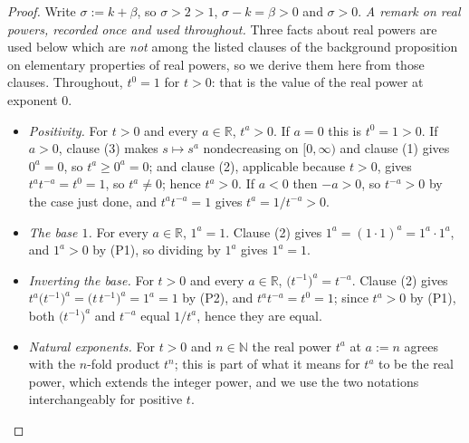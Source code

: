 \begin{proof}
Write $\sigma:=k+\beta$, so $\sigma>2>1$, $\sigma-k=\beta>0$ and $\sigma>0$.
\medskip\noindent\emph{A remark on real powers, recorded once and used throughout.}  Three
facts about real powers are used below which are \emph{not} among the listed clauses of the
background proposition on elementary properties of real powers, so we derive them here from
those clauses.  Throughout, $t^{0}=1$ for $t>0$: that is the value of the real power at
exponent $0$.
\begin{itemize}
\item[(P1)] \emph{Positivity.}  For $t>0$ and every $a\in\mathbb{R}$, $t^{a}>0$.  If $a=0$ this
is $t^{0}=1>0$.  If $a>0$, clause (3) makes $s\mapsto s^{a}$ nondecreasing on $[0,\infty)$ and
clause (1) gives $0^{a}=0$, so $t^{a}\ge0^{a}=0$; and clause (2), applicable because $t>0$,
gives $t^{a}t^{-a}=t^{0}=1$, so $t^{a}\ne0$; hence $t^{a}>0$.  If $a<0$ then $-a>0$, so
$t^{-a}>0$ by the case just done, and $t^{a}t^{-a}=1$ gives $t^{a}=1/t^{-a}>0$.
\item[(P2)] \emph{The base $1$.}  For every $a\in\mathbb{R}$, $1^{a}=1$.  Clause (2) gives
$1^{a}=(1\cdot1)^{a}=1^{a}\cdot1^{a}$, and $1^{a}>0$ by (P1), so dividing by $1^{a}$ gives
$1^{a}=1$.
\item[(P3)] \emph{Inverting the base.}  For $t>0$ and every $a\in\mathbb{R}$,
$\bigl(t^{-1}\bigr)^{a}=t^{-a}$.  Clause (2) gives
$t^{a}\bigl(t^{-1}\bigr)^{a}=\bigl(t\,t^{-1}\bigr)^{a}=1^{a}=1$ by (P2), and
$t^{a}t^{-a}=t^{0}=1$; since $t^{a}>0$ by (P1), both $\bigl(t^{-1}\bigr)^{a}$ and $t^{-a}$
equal $1/t^{a}$, hence they are equal.
\item[(P4)] \emph{Natural exponents.}  For $t>0$ and $n\in\mathbb{N}$ the real power $t^{a}$ at
$a:=n$ agrees with the $n$-fold product $t^{n}$; this is part of what it means for $t^{a}$ to be
the real power, which extends the integer power, and we use the two notations
interchangeably for positive $t$.
\end{itemize}



\end{proof}
